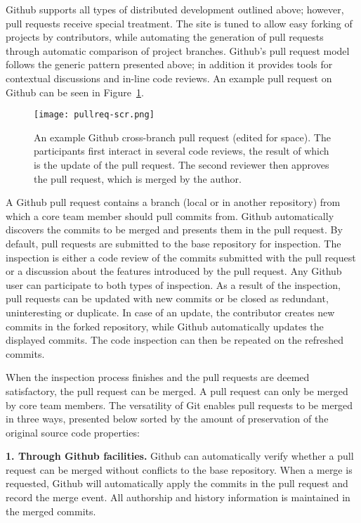 \documentclass{sig-alternate}
\begin{document}
Github supports all types of distributed development outlined above; however,
pull requests receive special treatment. The site is tuned to allow easy forking
of projects by contributors, while automating the generation of pull requests
through automatic comparison of project branches.
Github's pull request model follows the generic pattern presented above; in
addition it provides tools for contextual discussions and in-line code reviews.
An example pull request on Github can be seen in Figure~\ref{fig:pullreq-scr}.

\begin{figure}[t]
  \centering
   \texttt{[image: pullreq-scr.png]}

   \caption{An example Github cross-branch pull request (edited for space). The
   participants first interact in several code reviews, the result of which is
   the update of the pull request. The second reviewer then approves the pull
   request, which is merged by the author.}
   \label{fig:pullreq-scr}

\end{figure}

A Github pull request contains a branch (local or in another repository) from
which a core team member should pull commits from. Github automatically
discovers the commits to be merged and presents them in the pull request. By
default, pull requests are submitted to the base repository for inspection. The
inspection is either a code review of the commits submitted with the pull
request or a discussion about the features introduced by the pull request. Any
Github user can participate to both types of inspection. As a result of the
inspection, pull requests can be updated with new commits or be closed as
redundant, uninteresting or duplicate. In case of an update, the contributor
creates new commits in the forked repository, while Github automatically
updates the displayed commits. The code inspection can then be repeated on the
refreshed commits.

When the inspection process finishes and the pull requests are deemed
satisfactory, the pull request can be merged. A pull request can only be merged
by core team members. The versatility of Git enables pull requests to be
merged in three ways, presented below sorted by the amount of preservation of
the original source code properties:

\textbf{1. Through Github facilities.}
    Github can automatically verify whether a
    pull request can be merged without conflicts to the base repository. When a
    merge is requested, Github will automatically apply the commits in the pull
    request and record the merge event. All authorship and history information
    is maintained in the merged commits.
\end{document}
